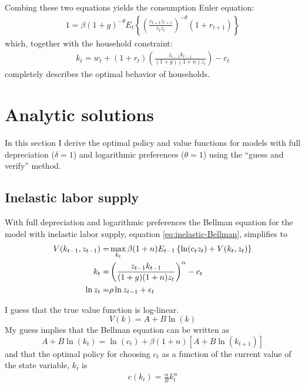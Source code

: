 \documentclass[11pt]{article}
\begin{document}
Combing these two equations yields the consumption Euler equation:
	\begin{align}\label{eq:elastic-euler}
		1= \beta(1+g)^{-\theta} E_{t}\left\{\left(\frac{c_{t+1}z_{t+1}}{c_t z_t}\right)^{-\theta}(1 + r_{t+1})\right\}
	\end{align}
which, together with the household constraint:
	\begin{align}\label{eq:elastic-HH-constraint}
		k_t= w_t + (1 + r_t)\left(\frac{z_{t-1}k_{t-1}}{(1 + g)(1 + n)z_t}\right) - c_t
	\end{align}
completely describes the optimal behavior of households.

\section{Analytic solutions}
In this section I derive the optimal policy and value functions for  models with full depreciation ($\delta=1$) and logarithmic preferences  ($\theta=1$) using the ``guess and verify'' method.

\subsection{Inelastic labor supply}
With full depreciation and logarithmic preferences the Bellman equation for the model with inelastic labor supply, equation \ref{eq:inelastic-Bellman}, simplifies to
\begin{align}
	V(k_{t-1}, z_{t-1}) =& \max_{k_t}  \beta(1+n) E_{t-1}\left\{\ln (c_t z_t) + V(k_t, z_t)\right\} \notag \\
	k_t =& \left(\frac{z_{t-1}k_{t-1}}{(1 + g)(1 + n)z_t}\right)^{\alpha} - c_t \\
	\ln z_t =& \rho \ln z_{t-1} + \epsilon_t
\end{align}

I guess that the true value function is log-linear.
\begin{equation}
V(k) = A + B\ln(k)
\end{equation}
My guess implies that the Bellman equation can be written as
\begin{equation}\label{eq:reduced-form-Bellman}
A + B\ln(k_t) = \ln(c_t) + \beta(1+n)[A + B\ln(k_{t+1})]
\end{equation}
and that the optimal policy for choosing $c_{t}$ as a function of the
current value of the state variable, $k_t$ is 
\begin{align}
c(k_t) = \frac{\alpha}{B}k_t^{\alpha}
\end{align}
\end{document}
